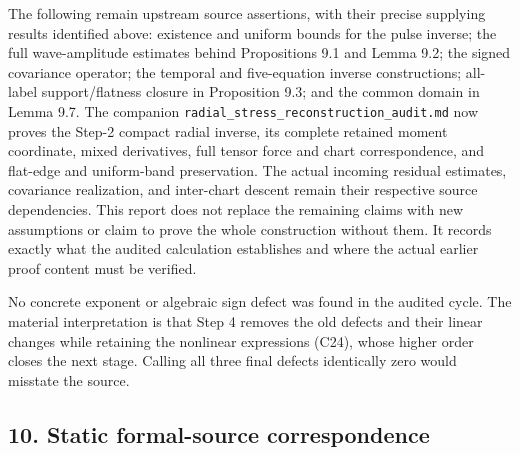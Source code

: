 \documentclass[10pt,a4paper]{article}
\begin{document}
The following remain upstream source assertions, with their precise supplying results identified above: existence and uniform bounds for the pulse inverse; the full wave-amplitude estimates behind Propositions 9.1 and Lemma 9.2; the signed covariance operator; the temporal and five-equation inverse constructions; all-label support/flatness closure in Proposition 9.3; and the common domain in Lemma 9.7. The companion \texttt{r\allowbreak{}a\allowbreak{}d\allowbreak{}i\allowbreak{}a\allowbreak{}l\allowbreak{}\_\allowbreak{}s\allowbreak{}t\allowbreak{}r\allowbreak{}e\allowbreak{}s\allowbreak{}s\allowbreak{}\_\allowbreak{}r\allowbreak{}e\allowbreak{}c\allowbreak{}o\allowbreak{}n\allowbreak{}s\allowbreak{}t\allowbreak{}r\allowbreak{}u\allowbreak{}c\allowbreak{}t\allowbreak{}i\allowbreak{}o\allowbreak{}n\allowbreak{}\_\allowbreak{}a\allowbreak{}u\allowbreak{}d\allowbreak{}i\allowbreak{}t\allowbreak{}.\allowbreak{}m\allowbreak{}d} now proves the Step-2 compact radial inverse, its complete retained moment coordinate, mixed derivatives, full tensor force and chart correspondence, and flat-edge and uniform-band preservation. The actual incoming residual estimates, covariance realization, and inter-chart descent remain their respective source dependencies. This report does not replace the remaining claims with new assumptions or claim to prove the whole construction without them. It records exactly what the audited calculation establishes and where the actual earlier proof content must be verified.

No concrete exponent or algebraic sign defect was found in the audited cycle. The material interpretation is that Step 4 removes the old defects and their linear changes while retaining the nonlinear expressions (C24), whose higher order closes the next stage. Calling all three final defects identically zero would misstate the source.

\subsection{10. Static formal-source correspondence}\label{nsupstream:stage_cycle_gain_audit:static-formal-source-correspondence}
\end{document}
